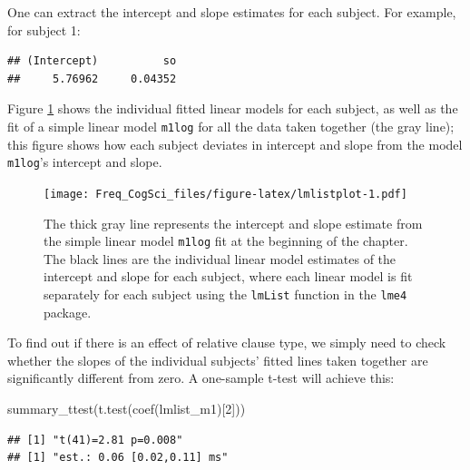 \documentclass[
  12pt,
]{krantz}
\newenvironment{Shaded}{\begin{snugshade}}{\end{snugshade}}
\newcommand{\AttributeTok}[1]{\textcolor[rgb]{0.77,0.63,0.00}{#1}}
\newcommand{\DecValTok}[1]{\textcolor[rgb]{0.00,0.00,0.81}{#1}}
\newcommand{\FunctionTok}[1]{\textcolor[rgb]{0.00,0.00,0.00}{#1}}
\newcommand{\NormalTok}[1]{#1}
\newcommand{\SpecialCharTok}[1]{\textcolor[rgb]{0.00,0.00,0.00}{#1}}
\newcommand{\StringTok}[1]{\textcolor[rgb]{0.31,0.60,0.02}{#1}}
\theoremstyle{definition}
\theoremstyle{definition}
\theoremstyle{definition}
\theoremstyle{definition}
\theoremstyle{remark}
\begin{document}
One can extract the intercept and slope estimates for each subject. For example, for subject 1:

\begin{Shaded}
\end{Shaded}

\begin{verbatim}
## (Intercept)          so 
##     5.76962     0.04352
\end{verbatim}

Figure \ref{fig:lmlistplot} shows the individual fitted linear models for each subject, as well as the fit of a simple linear model \texttt{m1log} for all the data taken together (the gray line); this figure shows how each subject deviates in intercept and slope from the model \texttt{m1log}'s intercept and slope.

\begin{figure}
\centering
\texttt{[image: Freq\_CogSci\_files/figure-latex/lmlistplot-1.pdf]}
\caption{\label{fig:lmlistplot}The thick gray line represents the intercept and slope estimate from the simple linear model \texttt{m1log} fit at the beginning of the chapter. The black lines are the individual linear model estimates of the intercept and slope for each subject, where each linear model is fit separately for each subject using the \texttt{lmList} function in the \texttt{lme4} package.}
\end{figure}

To find out if there is an effect of relative clause type, we simply need to check whether the slopes of the individual subjects' fitted lines taken together are significantly different from zero. A one-sample t-test will achieve this:

\begin{Shaded}
\begin{Highlighting}[]
\FunctionTok{summary\_ttest}\NormalTok{(}\FunctionTok{t.test}\NormalTok{(}\FunctionTok{coef}\NormalTok{(lmlist\_m1)[}\DecValTok{2}\NormalTok{]))}
\end{Highlighting}
\end{Shaded}

\begin{verbatim}
## [1] "t(41)=2.81 p=0.008"
## [1] "est.: 0.06 [0.02,0.11] ms"
\end{verbatim}
\end{document}
